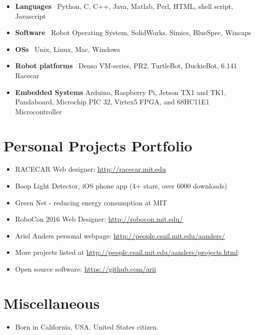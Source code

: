 \documentclass[10pt,letterpaper]{article}
\begin{document}
\begin{itemize}
	\item \textbf{Languages} \ Python, C, C++, Java, Matlab, Perl, HTML, shell script, Javascript
	\item \textbf{Software} \ Robot Operating System, SolidWorks, Simics, BlueSpec, Wincaps
	\item \textbf{OSs} \ Unix, Linux,  Mac, Windows
	\item \textbf{Robot platforms} \ Denso VM-series, PR2, TurtleBot, DuckieBot, 6.141 Racecar
	\item \textbf{Embedded Systems} Arduino, Raspberry Pi, Jetson TX1 and TK1, Pandaboard, Microchip PIC 32, Virtex5 FPGA, and  68HC11E1 Microcontroller 
\end{itemize}


\section*{Personal Projects Portfolio}
\begin{itemize}
\item RACECAR Web designer: \url{http://racecar.mit.edu}
\item Boop Light Detector, iOS phone app (4+ stars, over 6000 downloads)
\item Green Net - reducing energy consumption at MIT
\item RoboCon 2016 Web Designer: \url{http://robocon.mit.edu/}
\item Ariel Anders personal webpage: \url{http://people.csail.mit.edu/aanders/}
\item More projects listed at \url{http://people.csail.mit.edu/aanders/projects.html}:
\item Open source software: \url{https://github.com/arii}
\end{itemize}

\section*{Miscellaneous}

\begin{itemize}
\item Born in California, USA. United States citizen.
\end{itemize}
\end{document}
